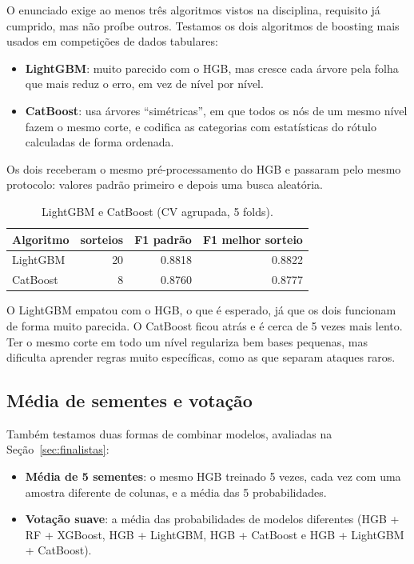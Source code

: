\documentclass[11pt,a4paper]{article}
\begin{document}
O enunciado exige ao menos três algoritmos vistos na disciplina, requisito já cumprido, mas não proíbe outros. Testamos os dois algoritmos de boosting mais usados em competições de dados tabulares:
\begin{itemize}
\item \textbf{LightGBM}: muito parecido com o HGB, mas cresce cada árvore pela folha que mais reduz o erro, em vez de nível por nível.
\item \textbf{CatBoost}: usa árvores ``simétricas'', em que todos os nós de um mesmo nível fazem o mesmo corte, e codifica as categorias com estatísticas do rótulo calculadas de forma ordenada.
\end{itemize}

Os dois receberam o mesmo pré-processamento do HGB e passaram pelo mesmo protocolo: valores padrão primeiro e depois uma busca aleatória.

\begin{table}[H]
\centering
\caption{LightGBM e CatBoost (CV agrupada, 5 folds).}
\begin{tabular}{lrrr}
\toprule
Algoritmo & sorteios & F1 padrão & F1 melhor sorteio \\
\midrule
LightGBM & 20 & 0.8818 & 0.8822 \\
CatBoost & 8 & 0.8760 & 0.8777 \\
\bottomrule
\end{tabular}
\end{table}

O LightGBM empatou com o HGB, o que é esperado, já que os dois funcionam de forma muito parecida. O CatBoost ficou atrás e é cerca de 5 vezes mais lento. Ter o mesmo corte em todo um nível regulariza bem bases pequenas, mas dificulta aprender regras muito específicas, como as que separam ataques raros.

\subsection{Média de sementes e votação}

Também testamos duas formas de combinar modelos, avaliadas na Seção~\ref{sec:finalistas}:
\begin{itemize}
\item \textbf{Média de 5 sementes}: o mesmo HGB treinado 5 vezes, cada vez com uma amostra diferente de colunas, e a média das 5 probabilidades.
\item \textbf{Votação suave}: a média das probabilidades de modelos diferentes (HGB + RF + XGBoost, HGB + LightGBM, HGB + CatBoost e HGB + LightGBM + CatBoost).
\end{itemize}
\end{document}
